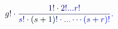 \documentclass[12pt]{article}
\begin{document}
\makeatletter
\renewcommand*{\@textcolor}[3]{%
  \protect\leavevmode
  \begingroup
    \color#1{#2}#3%
  \endgroup
}
\makeatother
\begin{displaymath}
\mathcolor[RGB]{0,0,15}{g} \mathcolor[RGB]{0,0,30}{!} \mathcolor[RGB]{0,0,45}{\cdot} \mathcolor[RGB]{0,0,60}{\frac { \mathcolor[RGB]{0,0,75}{1} \mathcolor[RGB]{0,0,90}{!} \mathcolor[RGB]{0,0,105}{\cdot} \mathcolor[RGB]{0,0,120}{2} \mathcolor[RGB]{0,0,135}{!} \mathcolor[RGB]{0,0,150}{.} \mathcolor[RGB]{0,0,165}{.} \mathcolor[RGB]{0,0,180}{.} \mathcolor[RGB]{0,0,195}{r} \mathcolor[RGB]{0,0,210}{!} } { \mathcolor[RGB]{0,0,225}{s} \mathcolor[RGB]{0,0,240}{!} \mathcolor[RGB]{0,0,255}{\cdot} \mathcolor[RGB]{0,15,0}{(} \mathcolor[RGB]{0,15,15}{s} \mathcolor[RGB]{0,15,30}{+} \mathcolor[RGB]{0,15,45}{1} \mathcolor[RGB]{0,15,60}{)} \mathcolor[RGB]{0,15,75}{!} \mathcolor[RGB]{0,15,90}{\cdot} \mathcolor[RGB]{0,15,105}{.} \mathcolor[RGB]{0,15,120}{.} \mathcolor[RGB]{0,15,135}{.} \mathcolor[RGB]{0,15,150}{\cdots} \mathcolor[RGB]{0,15,165}{(} \mathcolor[RGB]{0,15,180}{s} \mathcolor[RGB]{0,15,195}{+} \mathcolor[RGB]{0,15,210}{r} \mathcolor[RGB]{0,15,225}{)} \mathcolor[RGB]{0,15,240}{!} } } \mathcolor[RGB]{0,15,255}{.}
\end{displaymath}
\end{document}
